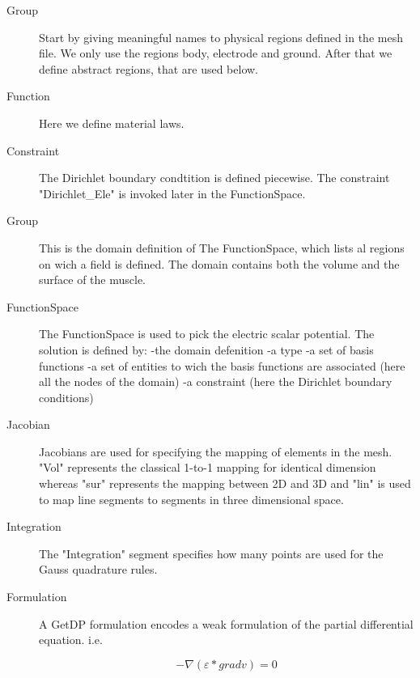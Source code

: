 \documentclass[preprint,journal]{vgtc}       %
\begin{document}
\begin{description}
	\item[Group]
	Start by giving meaningful names to physical regions defined in the mesh file.
	We only use the regions body, electrode and ground. 
	After that we define abstract regions, that are used below.
	\item[Function]
	Here we define material laws.
	\item[Constraint]
	The Dirichlet boundary condtition is defined piecewise. 
	The constraint "Dirichlet\_Ele" is invoked later in the FunctionSpace.
	\item[Group]
	This is the domain definition of The FunctionSpace, which lists al regions on wich a field is defined. 
	The domain contains both the volume and the surface of the muscle.
	\item[FunctionSpace]
	The FunctionSpace is used to pick the electric scalar potential. 
	The solution is defined  by:\newline
	-the domain defenition\newline
	-a type\newline
	-a set of basis functions\newline %
	-a set of entities to wich the basis functions are associated (here all the nodes of the domain)\newline
	-a constraint (here the Dirichlet boundary conditions)
	
	\item[Jacobian] 
	Jacobians are used for specifying the mapping of elements in the mesh.
	"Vol" represents the classical 1-to-1 mapping for identical dimension whereas "sur" represents the mapping between 2D and 3D and "lin" is used to map line segments to segments in three dimensional space.
	
	\item[Integration]
	The "Integration" segment specifies how many points are used for the Gauss quadrature rules. %
	
	\item[Formulation]
	A GetDP formulation encodes a weak formulation of the partial differential equation. i.e. 
	
	
	\[-\nabla (\varepsilon *\mathrel{grad} v) = 0\]
	

\end{description}
\end{document}
